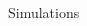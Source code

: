 \documentclass[final]{beamer}
\theoremstyle{definition}
\begin{document}
\begin{frame}[fragile]
\begin{textblock}{51}
\begin{block}{Simulations}
\end{block}




\end{textblock}

\end{frame}
\end{document}
